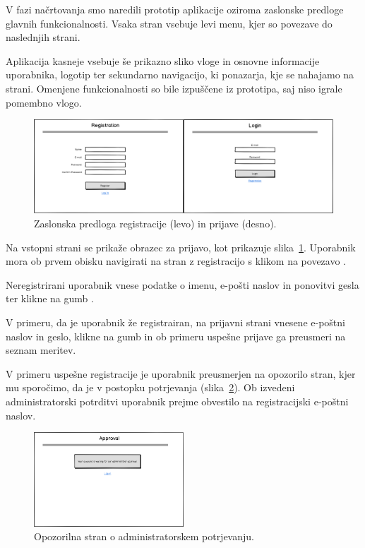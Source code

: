 \documentclass[a4paper, 12pt]{book}
\begin{document}
V fazi načrtovanja smo naredili prototip aplikacije oziroma zaslonske predloge glavnih funkcionalnosti. Vsaka stran vsebuje levi menu, kjer so povezave do naslednjih strani. 

Aplikacija kasneje vsebuje še prikazno sliko vloge in osnovne informacije uporabnika, logotip ter sekundarno navigacijo, ki ponazarja, kje se nahajamo na strani. Omenjene funkcionalnosti so bile izpuščene iz prototipa, saj niso igrale pomembno vlogo.

\begin{figure}[b]
\begin{center}
\includegraphics[width=\textwidth]{slike/registration_and_Login-wireframe.png}
\end{center}
\caption{Zaslonska predloga registracije (levo) in prijave (desno).}
\label{registration-login-wireframe}
\end{figure}

Na vstopni strani se prikaže obrazec za prijavo, kot prikazuje slika~\ref{registration-login-wireframe}. Uporabnik mora ob prvem obisku navigirati na stran z registracijo s klikom na povezavo .

Neregistrirani uporabnik vnese podatke o imenu, e-pošti naslov in ponovitvi gesla ter klikne na gumb .

V primeru, da je uporabnik že registrairan, na prijavni strani vnesene e-poštni naslov in geslo, klikne na gumb  in ob primeru uspešne prijave ga preusmeri na seznam meritev.


V primeru uspešne registracije je uporabnik preusmerjen na opozorilo stran, kjer mu sporočimo, da je v postopku potrjevanja (slika~\ref{approval-wireframe}).
Ob izvedeni administratorski potrditvi uporabnik prejme obvestilo na registracijski e-poštni naslov.

\begin{figure}[h]
\begin{center}
\includegraphics[width=0.5\textwidth]{slike/NotAlloved.png}
\end{center}
\caption{Opozorilna stran o administratorskem potrjevanju.}
\label{approval-wireframe}
\end{figure}
\end{document}
